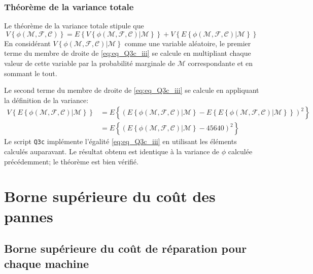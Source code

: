 \documentclass[a4paper, 12pt]{article}
\newcommand{\M}{\mathcal{M}}
\newcommand{\F}{\mathcal{F}}
\newcommand{\C}{\mathcal{C}}
\begin{document}
	\subsubsection{Théorème de la variance totale}
	Le théorème de la variance totale stipule que
	\begin{equation}
	    \label{eq:eq_Q3c_iii}
	    V\left\{\phi\left(\M,\F,\C\right)\right\} = E\left\{V\left\{\phi\left(\M,\F,\C\right)|\M\right\}\right\} + V\left\{E\left\{\phi\left(\M,\F,\C\right)|\M\right\}\right\}
	\end{equation}
	En considérant \(V\left\{\phi\left(\M,\F,\C\right)|\M\right\}\) comme une variable aléatoire, le premier terme du membre de droite de \eqref{eq:eq_Q3c_iii} se calcule en multipliant chaque valeur de cette variable par la probabilité marginale de \(\M\) correspondante et en sommant le tout.\par
	Le second terme du membre de droite de \eqref{eq:eq_Q3c_iii} se calcule en appliquant la définition de la variance:
	\begin{align*}
	    V\left\{E\left\{\phi\left(\M,\F,\C\right)|\M\right\}\right\} &= E\left\{\left(E\left\{\phi\left(\M,\F,\C\right)|\M\right\} - E\left\{E\left\{\phi\left(\M,\F,\C\right)|\M\right\}\right\}\right)^2\right\}\\
	    &= E\left\{\left(E\left\{\phi\left(\M,\F,\C\right)|\M\right\} - \num{45640}\right)^2\right\}
	\end{align*}
	Le script \texttt{Q3c} implémente l'égalité \eqref{eq:eq_Q3c_iii} en utilisant les éléments calculés auparavant. Le résultat obtenu est identique à la variance de \(\phi\) calculée précédemment; le théorème est bien vérifié.
	\section{Borne supérieure du coût des pannes}
	\subsection{Borne supérieure du coût de réparation pour chaque machine}
\end{document}
